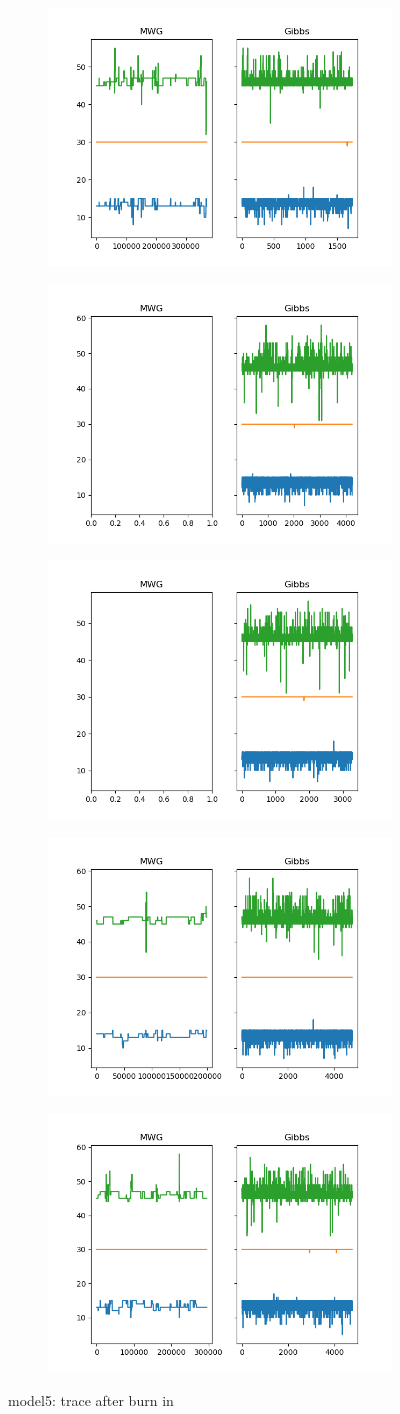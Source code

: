 \begin{figure}[H]
    \centering
    \begin{subfigure}
    	\centering
        \includegraphics[width=0.3\linewidth]{../../plots/Trace_post_burnin_M4_N60_NMCMC3_seed0_diffind2.png}
    \end{subfigure}
    \begin{subfigure}
        \centering
    	\includegraphics[width=0.3\linewidth]{../../plots/Trace_post_burnin_M4_N60_NMCMC3_seed1_diffind2.png}
	\end{subfigure}
	\begin{subfigure}
	    \centering
    	\includegraphics[width=0.3\linewidth]{../../plots/Trace_post_burnin_M4_N60_NMCMC3_seed2_diffind2.png}
	\end{subfigure}
	\begin{subfigure}
	    \centering
    	\includegraphics[width=0.3\linewidth]{../../plots/Trace_post_burnin_M4_N60_NMCMC3_seed3_diffind2.png}
	\end{subfigure}
	\begin{subfigure}
	    \centering
    	\includegraphics[width=0.3\linewidth]{../../plots/Trace_post_burnin_M4_N60_NMCMC3_seed4_diffind2.png}
	\end{subfigure}
	\caption{model5: trace after burn in}
\end{figure}


